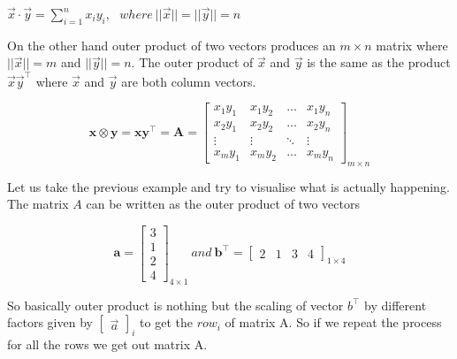 \documentclass{article}
\begin{document}
\begin{center}
    $\vec{x}\cdot\vec{y} = \sum_{i=1}^{n} x_{i}y_{i}$, \
    $ where \ ||\vec{x}|| = ||\vec{y}|| = n$
\end{center}

On the other hand outer product of two vectors produces an $m \times n$ matrix where $||\vec{x}|| = m$ and $||\vec{y}|| = n$. The outer product of $\vec{x}$ and $\vec{y}$ is the same as the product $\vec{x}\vec{y}^{\top}$ where $\vec{x}$ and $\vec{y}$ are both column vectors.

$$
{\displaystyle 
    \mathbf {x} \otimes \mathbf {y} =\mathbf{x}\mathbf{y^{\top}} =\mathbf {A} =
    {\begin{bmatrix} 
        x_{1}y_{1} & x_{1}y_{2} & \dots & x_{1}y_{n} \\ 
        x_{2}y_{1} & x_{2}y_{2} & \dots & x_{2}y_{n} \\ 
        \vdots & \vdots & \ddots & \vdots \\ 
        x_{m}y_{1} & x_{m}y_{2} & \dots & x_{m}y_{n}
    \end{bmatrix}_{m \times n}}
}
$$

Let us take the previous example and try to visualise what is actually happening. \\
The matrix $A$ can be written as the outer product of two vectors

$$
\mathbf{a} = {
\begin{bmatrix}
    3 \\
    1 \\
    2 \\
    4
\end{bmatrix}_{4 \times 1}
} \ and \
\mathbf{b^{\top}} = {
\begin{bmatrix}
    2 & 1 & 3 & 4
\end{bmatrix}_{1 \times 4}
}
$$

So basically outer product is nothing but the scaling of vector $b^{\top}$ by different factors given by $\begin{bmatrix}
    \vec{a}
\end{bmatrix}_{i}$ to get the $row_{i}$ of matrix A. So if we repeat the process for all the rows we get out matrix A.
\end{document}

